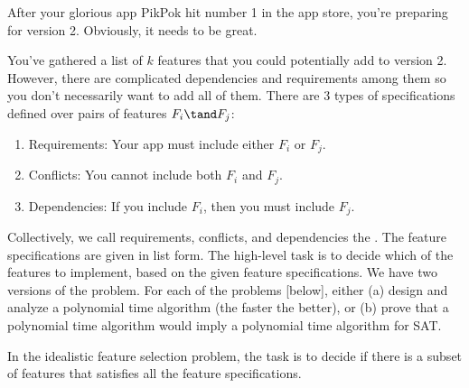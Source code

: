 \documentclass{article}
\begin{document}
 After your glorious app PikPok hit number 1 in the app store, you're
preparing for version 2.
Obviously, it needs to be great.

You've gathered a list of $k$ features  that you could potentially add to version 2.
However, there are complicated dependencies and requirements among them so you don't necessarily want to add all of them.
There are 3 types of specifications defined over pairs of features $F_i \tand F_j$: \begin{enumerate}
  \item Requirements: Your app must include either $F_i$ or $F_j$.
  \item Conflicts: You cannot include both $F_i$ and $F_j$.
  \item Dependencies: If you include $F_i$, then you must include $F_j$.
\end{enumerate}
Collectively, we call requirements, conflicts, and dependencies the .
The feature specifications are given in list form.
The high-level task is to decide which of the features to implement, based on the given feature specifications.
We have two versions of the problem. For each of the problems [below], either (a) design and analyze a polynomial time algorithm (the faster the better), or (b) prove that a polynomial time algorithm would imply a polynomial time algorithm for SAT.
\setcounter{section}{10}
\setcounter{exercise}{3}



\begin{subexercise}
In the idealistic feature selection problem, the task is to decide if there is a subset of features that satisfies all the feature specifications.
\end{subexercise}
\end{document}
